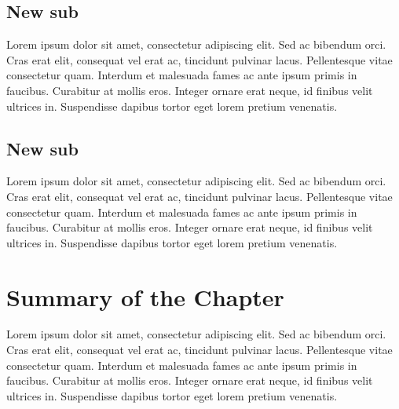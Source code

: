 \documentclass[./main.tex]{subfiles}
\begin{document}
\subsection{New sub}

\par Lorem ipsum dolor sit amet, consectetur adipiscing elit. Sed ac bibendum orci. Cras erat elit, consequat vel erat ac, tincidunt pulvinar lacus. Pellentesque vitae consectetur quam. Interdum et malesuada fames ac ante ipsum primis in faucibus. Curabitur at mollis eros. Integer ornare erat neque, id finibus velit ultrices in. Suspendisse dapibus tortor eget lorem pretium venenatis.

\subsection{New sub}

\par Lorem ipsum dolor sit amet, consectetur adipiscing elit. Sed ac bibendum orci. Cras erat elit, consequat vel erat ac, tincidunt pulvinar lacus. Pellentesque vitae consectetur quam. Interdum et malesuada fames ac ante ipsum primis in faucibus. Curabitur at mollis eros. Integer ornare erat neque, id finibus velit ultrices in. Suspendisse dapibus tortor eget lorem pretium venenatis.

\clearpage

\section{Summary of the Chapter}

\par Lorem ipsum dolor sit amet, consectetur adipiscing elit. Sed ac bibendum orci. Cras erat elit, consequat vel erat ac, tincidunt pulvinar lacus. Pellentesque vitae consectetur quam. Interdum et malesuada fames ac ante ipsum primis in faucibus. Curabitur at mollis eros. Integer ornare erat neque, id finibus velit ultrices in. Suspendisse dapibus tortor eget lorem pretium venenatis.
\end{document}
